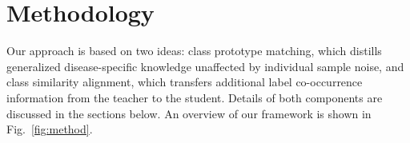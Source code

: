 \documentclass[runningheads]{llncs}
\newcommand{\wdai}[1]{{\color[rgb]{0.9,0.1,0.1}{#1}}}
\begin{document}

\section{Methodology}
\label{sec:methodology}
Our approach is based on two ideas: class prototype matching, which distills generalized disease-specific knowledge unaffected by individual sample noise, and class similarity alignment, which transfers additional label co-occurrence information from the teacher to the student. Details of both components are discussed in the sections below. An overview of our framework is shown in Fig.~\ref{fig:method}.

\end{document}
